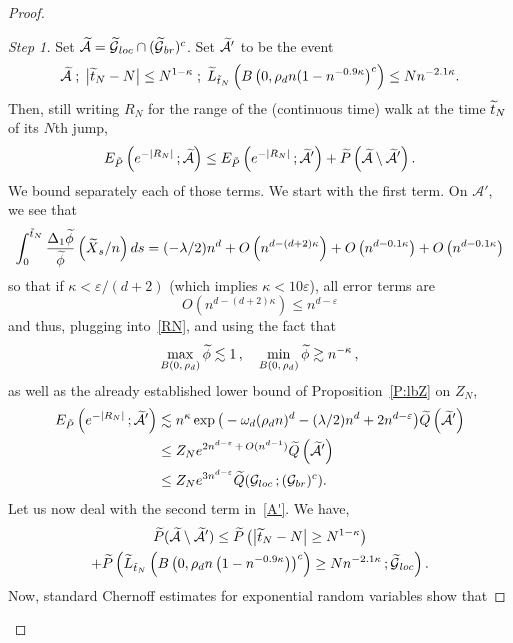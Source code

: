 \documentclass[AHL, Unicode, longabstracts, published]{cedram}
\newenvironment{step}[1]{\begin{proof}[#1]}{\let\qed\relax\end{proof}}
\newcommand{\Pmh}{P}
\newcommand*\E {{E}}
\newcommand{\cA}{\mathcal{A}}
\newcommand{\cG}{\mathcal{G}}
\newcommand*\Q{{Q}}
\newcommand*\eps{\varepsilon}
\let\oldtilde\tilde
\renewcommand*{\tilde}[1]{\mathchoice{\widetilde{#1}}{\widetilde{#1}}{\oldtilde{#1}}{\oldtilde{#1}}}\let\oldhat\hat
\renewcommand*{\hat}[1]{\mathchoice{\widehat{#1}}{\widehat{#1}}{\oldhat{#1}}{\oldhat{#1}}}\let\oldexists\exists
\renewcommand*{\exists}{\mathrel{\oldexists}}
\begin{document}
\begin{proof}
\begin{step}{Step 1}
Set $\tilde \cA = \tilde \cG_{loc} \cap (\tilde \cG_{br})^c$. Set $\tilde \cA' $ to be the event
\[
\tilde \cA\; ; \; \left|\tilde t_{N} - N \right| \le N^{1-\kappa} \; ; \; \tilde L_{\tilde t_N} \left(B\left(0,\rho_d n(1- n^{ - 0.9 \kappa}\right)^c\right) \le N n^{-2.1 \kappa}.
\]
Then, still writing $R_N$ for the range of the (continuous time) walk at the time $\tilde t_N$ of its $N$th jump,
\begin{equation}\label{A'}
\E_{\tilde \Pmh}\left(e^{- |R_N|}\,; \tilde \cA\right) \le \E_{\tilde \Pmh}\left(e^{-|R_N|}\,; \tilde \cA'\right) + \tilde \Pmh\left(\tilde \cA \setminus \tilde \cA'\right).
\end{equation}
We bound separately each of those terms. We start with the first term. On $\cA'$, we see that
\[
\int_0^{\tilde t_N} \frac{\Delta_1 \tilde \phi}{\tilde \phi}\left(\tilde X_s/n\right)ds = (- \lambda /2) n^d + O \left(n^{d- (d+2) \kappa}\right) + O \left(n^{d- 0.1\kappa}\right) + O \left(n^{d- 0.1 \kappa}\right)
\]
so that if $\kappa < \eps/(d+2)$ (which implies $\kappa < 10 \eps$), all error terms are
\[
O \left(n^{d- (d+2)\kappa}\right) \le n^{d- \eps}
\]
and thus, plugging into~\eqref{RN}, and using the fact that
\[
\max_{B(0,\,\rho_d)} \tilde \phi \lesssim 1 \,,\quad \min_{B(0,\,\rho_d)} \tilde \phi \gtrsim n^{- \kappa}\,,
\]
as well as the already established lower bound of Proposition~\ref{P:lbZ} on $Z_N $,
\begin{equation}\label{chgmeasA'}
\begin{aligned}
\E_{\tilde \Pmh} \left(e^{- |R_N|}\,; \tilde \cA'\right) &\lesssim n^\kappa\exp\big(- \omega_d (\rho_d n)^d - (\lambda/2) n^d + 2n^{d- \eps} \big) \tilde \Q\left(\tilde \cA'\right)\\
& \le Z_N e^{2n^{d- \eps}\,+\,O(n^{d-1})} \tilde \Q\left(\tilde \cA'\right)\\
& \le Z_N e^{3n^{d- \eps}} \tilde \Q(\cG_{loc}\,; (\cG_{br})^c).
\end{aligned}
\end{equation}
Let us now deal with the second term in~\eqref{A'}. We have,
\begin{multline}\label{decA'}
\tilde \Pmh(\tilde \cA\setminus \tilde \cA') \le \tilde \Pmh\left(\left|\tilde t_N - N\right| \ge N^{1- \kappa}\right)\\
+ \tilde \Pmh \left(\tilde L_{\tilde t_N} \left(B\left(0, \rho_d n\left(1 - n^{- 0.9 \kappa}\right)\right)^c\right) \ge N n^{- 2.1\kappa}\,; \tilde \cG_{loc}\right).
\end{multline}
Now, standard Chernoff estimates for exponential random variables show that

\end{step}
\end{proof}
\end{document}
